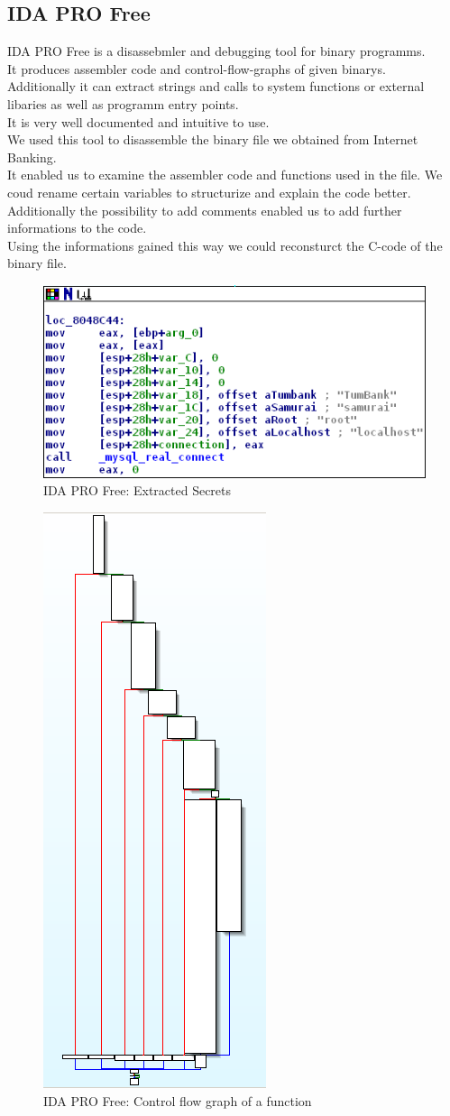 \subsection{IDA PRO Free}
IDA PRO Free is a disassebmler and debugging tool for binary programms.\\
It produces assembler code and control-flow-graphs of given binarys.\\
Additionally it can extract strings and calls to system functions or external libaries as well as programm entry points. \\
It is very well documented and intuitive to use. \\
We used this tool to disassemble the binary file  we obtained from Internet Banking. \\
It enabled us to examine the assembler code and functions used in the file. We coud rename certain variables to structurize and explain the code better. Additionally the possibility to add comments enabled us to add further informations to the code.\\
Using the informations gained this way we could reconsturct the C-code of the binary file.
\begin{figure}[ht]
	\centering
	\includegraphics[width=.8\linewidth]{figures/ida_db_info.png}
	\caption{IDA PRO Free: Extracted Secrets}
	\label{fig:ida_db_info}
\end{figure}
\begin{figure}[ht]
	\centering
	\includegraphics[width=.3\linewidth]{figures/ida_cfg_mysql_query_function.png}
	\caption{IDA PRO Free: Control flow graph of a function}
	\label{fig:ida_control_flow}
\end{figure}
